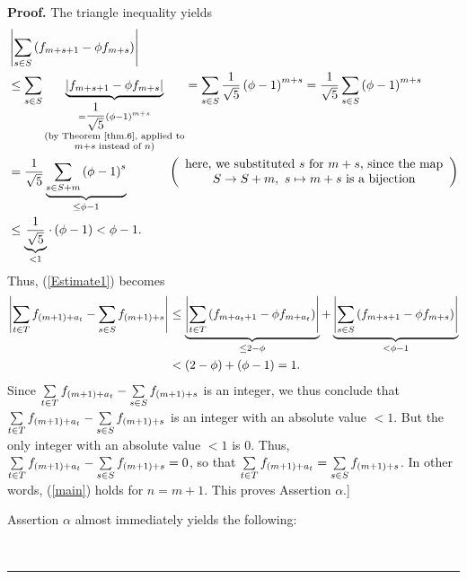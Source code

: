 \documentclass[numbers=enddot,12pt,final,onecolumn,notitlepage]{scrartcl}%
\numberwithin{exer}{section}
\theoremstyle{definition}
\newenvironment{proof}[1][Proof]{\noindent\textbf{#1.} }{\ \rule{0.5em}{0.5em}}
\let\sumnonlimits\sum
\renewcommand{\sum}{\sumnonlimits\limits}
\begin{document}
\begin{proof}
The triangle inequality yields%
\begin{align*}
&  \left\vert \sum\limits_{s\in S}\left(  f_{m+s+1}-\phi f_{m+s}\right)
\right\vert \\
&  \leq\sum\limits_{s\in S}\underbrace{\left\vert f_{m+s+1}-\phi
f_{m+s}\right\vert }_{\substack{=\dfrac{1}{\sqrt{5}}\left(  \phi-1\right)
^{m+s}\\\text{(by Theorem~\ref{thm.6}, applied to}\\m+s\text{ instead of
}n\text{)}}}=\sum\limits_{s\in S}\dfrac{1}{\sqrt{5}}\left(  \phi-1\right)
^{m+s}=\dfrac{1}{\sqrt{5}}\sum\limits_{s\in S}\left(  \phi-1\right)  ^{m+s}\\
&  =\dfrac{1}{\sqrt{5}}\underbrace{\sum\limits_{s\in S+m}\left(
\phi-1\right)  ^{s}}_{\leq\phi-1}\ \ \ \ \ \ \ \ \ \ \left(
\begin{array}
[c]{c}%
\text{here, we substituted }s\text{ for }m+s\text{, since the map}\\
S\rightarrow S+m,\ s\mapsto m+s\text{ is a bijection}%
\end{array}
\right) \\
&  \leq\underbrace{\dfrac{1}{\sqrt{5}}}_{<1}\cdot\left(  \phi-1\right)
<\phi-1.
\end{align*}
Thus, (\ref{Estimate1}) becomes%
\begin{align}
\left\vert \sum\limits_{t\in T}f_{\left(  m+1\right)  +a_{t}}-\sum
\limits_{s\in S}f_{\left(  m+1\right)  +s}\right\vert  &  \leq
\underbrace{\left\vert \sum\limits_{t\in T}\left(  f_{m+a_{t}+1}-\phi
f_{m+a_{t}}\right)  \right\vert }_{\leq2-\phi}+\underbrace{\left\vert
\sum\limits_{s\in S}\left(  f_{m+s+1}-\phi f_{m+s}\right)  \right\vert
}_{<\phi-1}\nonumber\\
&  <\left(  2-\phi\right)  +\left(  \phi-1\right)  =1.\nonumber
\end{align}
Since $\sum\limits_{t\in T}f_{\left(  m+1\right)  +a_{t}}-\sum\limits_{s\in
S}f_{\left(  m+1\right)  +s}$ is an integer, we thus conclude that
$\sum\limits_{t\in T}f_{\left(  m+1\right)  +a_{t}}-\sum\limits_{s\in
S}f_{\left(  m+1\right)  +s}$ is an integer with an absolute value $<1$. But
the only integer with an absolute value $<1$ is $0$. Thus, $\sum\limits_{t\in
T}f_{\left(  m+1\right)  +a_{t}}-\sum\limits_{s\in S}f_{\left(  m+1\right)
+s}=0$, so that $\sum\limits_{t\in T}f_{\left(  m+1\right)  +a_{t}}%
=\sum\limits_{s\in S}f_{\left(  m+1\right)  +s}$. In other words, (\ref{main})
holds for $n=m+1$. This proves Assertion $\alpha$.]

Assertion $\alpha$ almost immediately yields the following:


\end{proof}
\end{document}
